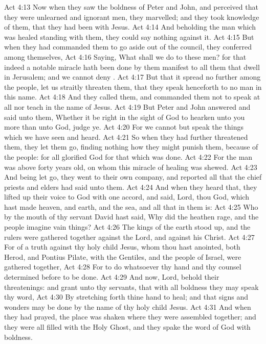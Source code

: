 \vs Act 4:13 Now when they saw the boldness of Peter and John, and perceived that they were unlearned and ignorant men, they marvelled; and they took knowledge of them, that they had been with Jesus.
\vs Act 4:14 And beholding the man which was healed standing with them, they could say nothing against it.
\vs Act 4:15 But when they had commanded them to go aside out of the council, they conferred among themselves,
\vs Act 4:16 Saying, What shall we do to these men? for that indeed a notable miracle hath been done by them  manifest to all them that dwell in Jerusalem; and we cannot deny .
\vs Act 4:17 But that it spread no further among the people, let us straitly threaten them, that they speak henceforth to no man in this name.
\vs Act 4:18 And they called them, and commanded them not to speak at all nor teach in the name of Jesus.
\vs Act 4:19 But Peter and John answered and said unto them, Whether it be right in the sight of God to hearken unto you more than unto God, judge ye.
\vs Act 4:20 For we cannot but speak the things which we have seen and heard.
\vs Act 4:21 So when they had further threatened them, they let them go, finding nothing how they might punish them, because of the people: for all  glorified God for that which was done.
\vs Act 4:22 For the man was above forty years old, on whom this miracle of healing was shewed.
\vs Act 4:23 And being let go, they went to their own company, and reported all that the chief priests and elders had said unto them.
\vs Act 4:24 And when they heard that, they lifted up their voice to God with one accord, and said, Lord, thou  God, which hast made heaven, and earth, and the sea, and all that in them is:
\vs Act 4:25 Who by the mouth of thy servant David hast said, Why did the heathen rage, and the people imagine vain things?
\vs Act 4:26 The kings of the earth stood up, and the rulers were gathered together against the Lord, and against his Christ.
\vs Act 4:27 For of a truth against thy holy child Jesus, whom thou hast anointed, both Herod, and Pontius Pilate, with the Gentiles, and the people of Israel, were gathered together,
\vs Act 4:28 For to do whatsoever thy hand and thy counsel determined before to be done.
\vs Act 4:29 And now, Lord, behold their threatenings: and grant unto thy servants, that with all boldness they may speak thy word,
\vs Act 4:30 By stretching forth thine hand to heal; and that signs and wonders may be done by the name of thy holy child Jesus.
\vs Act 4:31 And when they had prayed, the place was shaken where they were assembled together; and they were all filled with the Holy Ghost, and they spake the word of God with boldness.
